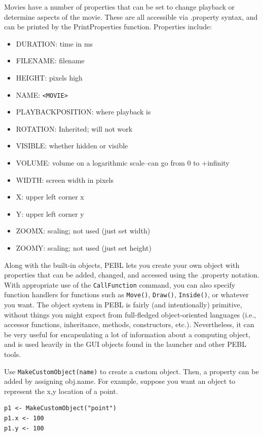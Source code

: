 Movies have a number of properties that can be set to change playback or determine aspects of the movie. These are all accessible via .property syntax, and can be printed by the PrintProperties function.  Properties include:
\begin{itemize}
\item DURATION: time in ms
\item FILENAME: filename
\item HEIGHT: pixels high
\item NAME: \verb+<MOVIE>+
\item PLAYBACKPOSITION: where playback is
\item ROTATION: Inherited; will not work 
\item VISIBLE: whether hidden or visible
\item VOLUME: volume on a logarithmic scale--can go from 0 to +infinity
\item WIDTH: screen width in pixels
\item X:  upper left corner x
\item Y:  upper left corner y
\item ZOOMX: scaling; not used (just set width)
\item ZOOMY: scaling; not used (just set height)
\end{itemize}

Along with the built-in objects, PEBL lets you create your own object with properties that can be added, changed, and accessed using the .property notation.  With appropriate use of the \texttt{CallFunction} command, you can also specify function handlers for functions such as \texttt{Move()}, \texttt{Draw()}, \texttt{Inside()}, or whatever you want.  The object system in PEBL is fairly (and intentionally) primitive, without things you might expect from full-fledged object-oriented languages (i.e., accessor functions, inheritance, methods, constructors, etc.).  Nevertheless, it can be very useful for encapsulating a lot of information about a computing object, and is used heavily in the GUI objects found in the launcher and other PEBL tools.

Use  \verb+MakeCustomObject(name)+ to create a custom object.  Then, a property can be added by assigning obj.name. For example, suppose you want an object to represent the x,y location of a point.
\begin{verbatim}
p1 <- MakeCustomObject("point")
p1.x <- 100
p1.y <- 100
\end{verbatim}

